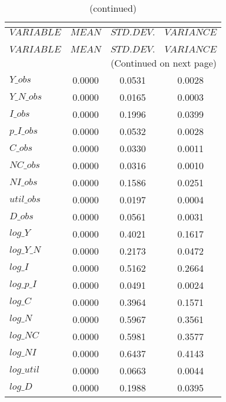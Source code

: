  
\begin{center}
\begin{longtable}{lccc} 
\caption{THEORETICAL MOMENTS}\\
 \label{Table:th_moments}\\
\toprule 
$VARIABLE   $	 & 	 $         MEAN$	 & 	 $    STD. DEV.$	 & 	 $     VARIANCE$\\
\midrule \endfirsthead 
\caption{(continued)}\\
 \toprule \\ 
$VARIABLE   $	 & 	 $         MEAN$	 & 	 $    STD. DEV.$	 & 	 $     VARIANCE$\\
\midrule \endhead 
\midrule \multicolumn{4}{r}{(Continued on next page)} \\ \bottomrule \endfoot 
\bottomrule \endlastfoot 
$Y\_obs     $	 & 	       0.0000	 & 	       0.0531	 & 	       0.0028 \\ 
$Y\_N\_obs  $	 & 	       0.0000	 & 	       0.0165	 & 	       0.0003 \\ 
$I\_obs     $	 & 	       0.0000	 & 	       0.1996	 & 	       0.0399 \\ 
$p\_I\_obs  $	 & 	       0.0000	 & 	       0.0532	 & 	       0.0028 \\ 
$C\_obs     $	 & 	       0.0000	 & 	       0.0330	 & 	       0.0011 \\ 
$NC\_obs    $	 & 	       0.0000	 & 	       0.0316	 & 	       0.0010 \\ 
$NI\_obs    $	 & 	       0.0000	 & 	       0.1586	 & 	       0.0251 \\ 
$util\_obs  $	 & 	       0.0000	 & 	       0.0197	 & 	       0.0004 \\ 
$D\_obs     $	 & 	       0.0000	 & 	       0.0561	 & 	       0.0031 \\ 
$log\_Y     $	 & 	       0.0000	 & 	       0.4021	 & 	       0.1617 \\ 
$log\_Y\_N  $	 & 	       0.0000	 & 	       0.2173	 & 	       0.0472 \\ 
$log\_I     $	 & 	       0.0000	 & 	       0.5162	 & 	       0.2664 \\ 
$log\_p\_I  $	 & 	       0.0000	 & 	       0.0491	 & 	       0.0024 \\ 
$log\_C     $	 & 	       0.0000	 & 	       0.3964	 & 	       0.1571 \\ 
$log\_N     $	 & 	       0.0000	 & 	       0.5967	 & 	       0.3561 \\ 
$log\_NC    $	 & 	       0.0000	 & 	       0.5981	 & 	       0.3577 \\ 
$log\_NI    $	 & 	       0.0000	 & 	       0.6437	 & 	       0.4143 \\ 
$log\_util  $	 & 	       0.0000	 & 	       0.0663	 & 	       0.0044 \\ 
$log\_D     $	 & 	       0.0000	 & 	       0.1988	 & 	       0.0395 \\ 
\end{longtable}
 \end{center}
